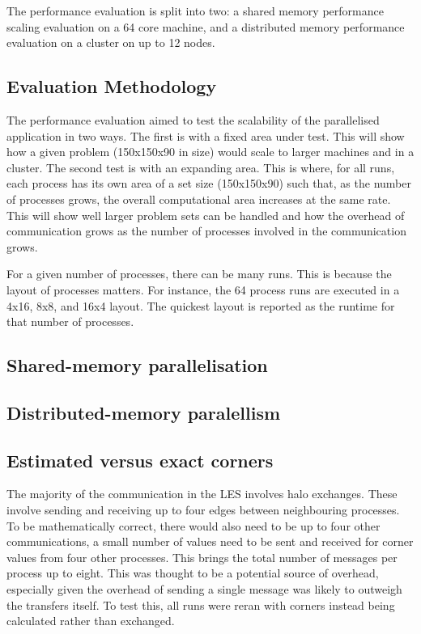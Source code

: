 The performance evaluation is split into two: a shared memory performance
scaling evaluation on a 64 core machine, and a distributed memory performance
evaluation on a cluster on up to 12 nodes.

\subsection{Evaluation Methodology}
\label{sec:mpievaluationmethodology}

The performance evaluation aimed to test the scalability of the parallelised
application in two ways. The first is with a fixed area under test. This will
show how a given problem (150x150x90 in size) would scale to larger machines and
in a cluster. The second test is with an expanding area. This is where, for all
runs, each process has its own area of a set size (150x150x90) such that, as the
number of processes grows, the overall computational area increases at the same
rate. This will show well larger problem sets can be handled and how the
overhead of communication grows as the number of processes involved in the
communication grows.

For a given number of processes, there can be many runs. This is because the
layout of processes matters. For instance, the 64 process runs are executed in a
4x16, 8x8, and 16x4 layout. The quickest layout is reported as the runtime for
that number of processes.

\subsection{Shared-memory parallelisation}


\subsection{Distributed-memory paralellism}


\subsection{Estimated versus exact corners}

The majority of the communication in the LES involves halo exchanges. These
involve sending and receiving up to four edges between neighbouring processes.
To be mathematically correct, there would also need to be up to four other
communications, a small number of values need to be sent and received for corner
values from four other processes. This brings the total number of messages per
process up to eight. This was thought to be a potential source of overhead,
especially given the overhead of sending a single message was likely to outweigh
the transfers itself. To test this, all runs were reran with corners instead
being calculated rather than exchanged.

